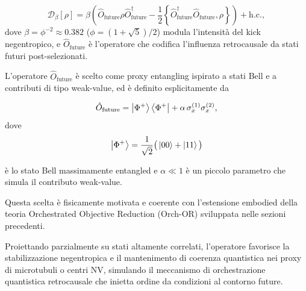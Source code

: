 \documentclass[11pt,a4paper]{article}
\theoremstyle{plain}
\theoremstyle{definition}
\begin{document}
\vspace{0.3cm}

\begin{tcolorbox}[colback=blue!3!white, colframe=blue!80!black,
                  title={\textbf{Termine retrocausale-negentropico $\mathcal{D}_\beta[\rho]$}},
                  fonttitle=\bfseries, sharp corners, boxrule=0.9pt]
\begin{equation}
\mathcal{D}_\beta[\rho] = \beta \left( \hat{O}_{\text{future}} \rho \hat{O}_{\text{future}}^\dagger 
- \frac{1}{2} \left\{ \hat{O}_{\text{future}}^\dagger \hat{O}_{\text{future}}, \rho \right\} \right) + \text{h.c.},
\label{eq:d_beta}
\end{equation}
dove $\beta = \phi^{-2} \approx 0.382$ ($\phi = (1+\sqrt{5})/2$) modula l’intensità del kick negentropico, e $\hat{O}_{\text{future}}$ è l’operatore che codifica l’influenza retrocausale da stati futuri post-selezionati.
\end{tcolorbox}


\vspace{0.3cm}

L’operatore $\hat{O}_{\text{future}}$ è scelto come proxy entangling ispirato a stati Bell e a contributi di tipo weak-value, ed è definito esplicitamente da

\vspace{0.2cm}
\begin{equation}
\hat{O}_{\text{future}} = \ket{\Phi^+}\bra{\Phi^+} + \alpha \, \sigma_x^{(1)}\sigma_x^{(2)},
\label{eq:o_future}
\end{equation}
dove 
\begin{equation}
\ket{\Phi^+} = \frac{1}{\sqrt{2}} \big( \ket{00} + \ket{11} \big)
\label{eq:phi_plus}
\end{equation}


\vspace{0.3cm}
è lo stato Bell massimamente entangled e $\alpha \ll 1$ è un piccolo parametro che simula il contributo weak-value.


\vspace{0.3cm}

Questa scelta è fisicamente motivata e coerente con l’estensione embodied della teoria Orchestrated Objective Reduction (Orch-OR) sviluppata nelle sezioni precedenti. 

\vspace{0.2cm}



Proiettando parzialmente su stati altamente correlati, l’operatore favorisce la stabilizzazione negentropica e il mantenimento di coerenza quantistica nei proxy di microtubuli o centri NV, simulando il meccanismo di orchestrazione quantistica retrocausale che inietta ordine da condizioni al contorno future. 
\end{document}
